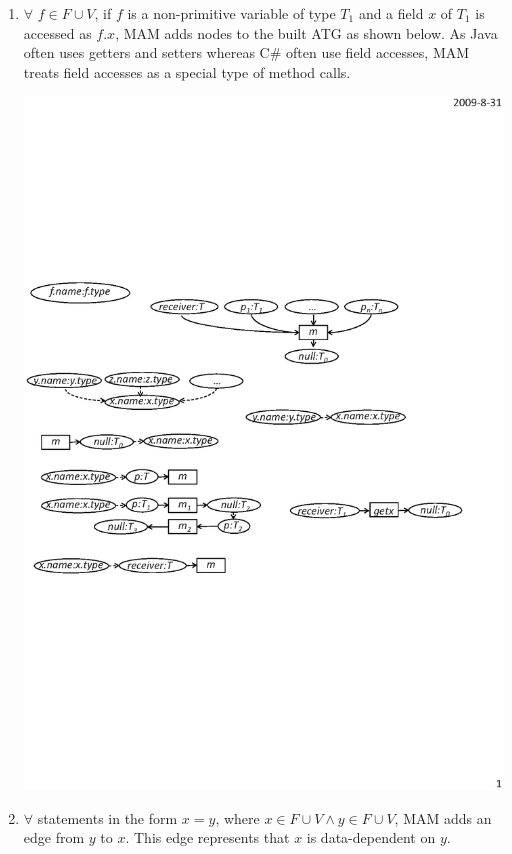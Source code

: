 \begin{enumerate}
\item $\forall$ $f\in F \cup V$, if $f$ is a non-primitive variable
of type $T_1$ and a field $x$ of $T_1$ is accessed as $f.x$, MAM adds nodes to the built ATG as shown below. As Java often
uses getters and setters whereas C\# often use field accesses, MAM treats field accesses as a special type of method
calls. \vspace*{-2ex}

\begin{center}
\includegraphics[scale=0.7,clip]{figure/rule3.eps}%
\end{center}\vspace*{-4ex}

\item $\forall$ statements in the form $x = y$, where $x \in F \cup V \wedge y \in F \cup V$,
MAM adds an edge from $y$ to $x$. This edge represents that
$x$ is data-dependent on $y$.\vspace*{-1.5ex}


\end{enumerate}
